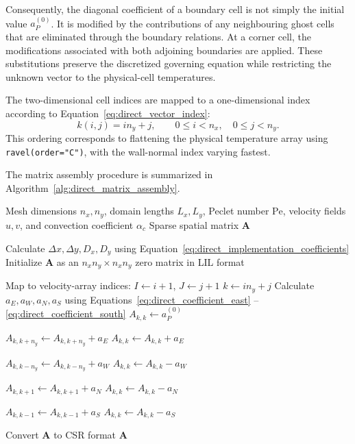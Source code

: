 Consequently, the diagonal coefficient of a boundary cell
is not simply the initial value $a_P^{(0)}$. It is modified
by the contributions of any neighbouring ghost cells that
are eliminated through the boundary relations. At a corner
cell, the modifications associated with both adjoining
boundaries are applied. These substitutions preserve the
discretized governing equation while restricting the unknown
vector to the physical-cell temperatures.

The two-dimensional cell indices are mapped to a one-dimensional
index according to
Equation~\eqref{eq:direct_vector_index}:
\begin{equation}
k(i,j)=i n_y+j,
\qquad
0\leq i<n_x,\quad 0\leq j<n_y.
\label{eq:direct_implementation_index}
\end{equation}
This ordering corresponds to flattening the physical temperature
array using \texttt{ravel(order="C")}, with the wall-normal
index varying fastest.

The matrix assembly procedure is summarized in
Algorithm~\ref{alg:direct_matrix_assembly}.

\begin{algorithm}[H]
\caption{Assembly of the Sparse Spatial Matrix}
\label{alg:direct_matrix_assembly}
\begin{algorithmic}[1]
\Require Mesh dimensions $n_x,n_y$, domain lengths $L_x,L_y$,
Peclet number $\mathrm{Pe}$, velocity fields $u,v$, and
convection coefficient $\alpha_c$
\Ensure Sparse spatial matrix $\mathbf{A}$

\State Calculate $\Delta x,\Delta y,D_x,D_y$ using
Equation~\eqref{eq:direct_implementation_coefficients}
\State Initialize $\mathbf{A}$ as an $n_xn_y\times n_xn_y$
zero matrix in LIL format

        \State Map to velocity-array indices:
        $I\gets i+1$, $J\gets j+1$
        \State $k\gets i n_y+j$
        \State Calculate $a_E,a_W,a_N,a_S$ using
        Equations~\eqref{eq:direct_coefficient_east}
        --\eqref{eq:direct_coefficient_south}
        \State $A_{k,k}\gets a_P^{(0)}$

            \State $A_{k,k+n_y}\gets
            A_{k,k+n_y}+a_E$
        \Else
            \State $A_{k,k}\gets A_{k,k}+a_E$
        \EndIf

            \State $A_{k,k-n_y}\gets
            A_{k,k-n_y}+a_W$
        \Else
            \State $A_{k,k}\gets A_{k,k}-a_W$
        \EndIf

            \State $A_{k,k+1}\gets A_{k,k+1}+a_N$
        \Else
            \State $A_{k,k}\gets A_{k,k}-a_N$
        \EndIf

            \State $A_{k,k-1}\gets A_{k,k-1}+a_S$
        \Else
            \State $A_{k,k}\gets A_{k,k}-a_S$
        \EndIf
    \EndFor
\EndFor

\State Convert $\mathbf{A}$ to CSR format
\State \Return $\mathbf{A}$
\end{algorithmic}
\end{algorithm}

